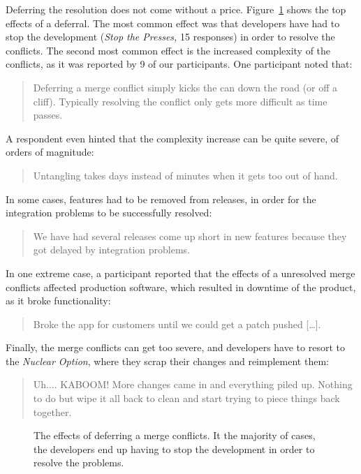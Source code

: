
Deferring the resolution does not come without a price.
Figure~\ref{fig:effects-deferral} shows the top effects of a deferral.
The most common effect was that developers have had to stop the development (\emph{Stop the Presses,} 15 responses) in order to resolve the conflicts.
The second most common effect is the increased complexity of the conflicts, as it was reported by 9 of our participants.
One participant noted that:
\begin{quotation}
	Deferring a merge conflict simply kicks the can down the road (or off a cliff). Typically resolving the conflict only gets more difficult as time passes.
\end{quotation}
A respondent even hinted that the complexity increase can be quite severe, of orders of magnitude:
\begin{quotation}
	Untangling takes days instead of minutes when it gets too out of hand.
\end{quotation}
In some cases, features had to be removed from releases, in order for the integration problems to be successfully resolved:
\begin{quotation}
	We have had several releases come up short in new features because they got delayed by integration problems.
\end{quotation}

In one extreme case, a participant reported that the effects of a unresolved merge conflicts affected production software, which resulted in downtime of the product, as it broke functionality:
\begin{quotation}
	Broke the app for customers until we could get a patch pushed [\ldots].
\end{quotation}
Finally, the merge conflicts can get too severe, and developers have to resort to the \emph{Nuclear Option}, where they scrap their changes and reimplement them:
\begin{quotation}
	Uh.... KABOOM! More changes came in and everything piled up. Nothing to do but wipe it all back to clean and start trying to piece things back together.
\end{quotation}

\begin{figure}
	\centering
	\caption{The effects of deferring a merge conflicts. It the majority of cases, the developers end up having to stop the development in order to resolve the problems.\vspace*{-0.3\baselineskip}}
	\label{fig:effects-deferral}
\end{figure}

